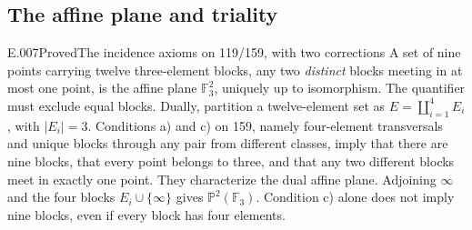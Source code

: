 \subsection{The affine plane and triality}
\begin{saresult}{E.007}{Proved}{The incidence axioms on 119/159, with two corrections}
A set of nine points carrying twelve three-element blocks, any two
\emph{distinct} blocks meeting in at most one point, is the affine plane
$\mathbb F_3^2$, uniquely up to isomorphism. The quantifier must exclude
equal blocks. Dually, partition a twelve-element set as
$E=\coprod_{i=1}^4E_i$, with $|E_i|=3$. Conditions a) and c) on 159,
namely four-element transversals and unique blocks through any pair
from different classes, imply that there are nine blocks, that every
point belongs to three, and that any two different blocks meet in
exactly one point. They characterize the dual affine plane. Adjoining
$\infty$ and the four blocks $E_i\cup\{\infty\}$ gives
$\mathbb P^2(\mathbb F_3)$.
Condition c) alone does not imply nine blocks, even if every block has
four elements.
\end{saresult}
